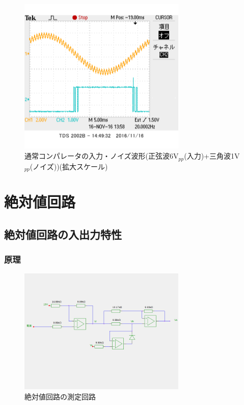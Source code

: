 \documentclass[11pt,a4j]{jsarticle}
\begin{document}
 \begin{figure}[htbp]
  \centering
  \includegraphics[width=8cm,clip]{1_2_noise_after_6-1_SmallScale.png}
  \caption{通常コンパレータの入力・ノイズ波形(正弦波6V$_{pp}$(入力)+三角波1V$_{pp}$(ノイズ))(拡大スケール)}
  \label{fig:noise_after_6-1_small}
 \end{figure}
    
    
    
    
    \clearpage
    
 \section{絶対値回路}
  \subsection{絶対値回路の入出力特性}
   \subsubsection{原理}
    
    \begin{figure}[htbp]
  \centering
  \includegraphics[width=8cm,clip]{abs_tokusei.png}
  \caption{絶対値回路の測定回路}
  \label{fig:abs_tokusei}
 \end{figure}%
    
\end{document}
